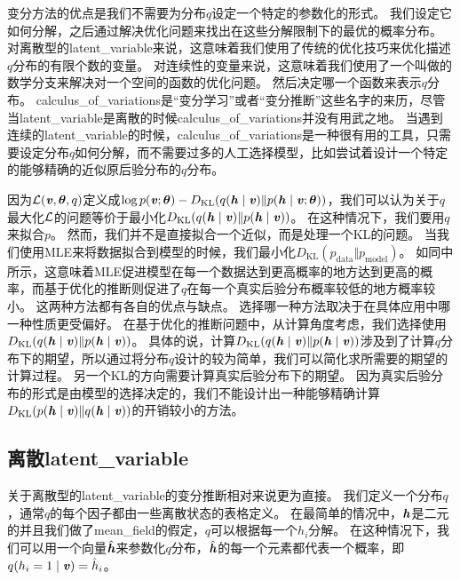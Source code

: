 变分方法的优点是我们不需要为分布$q$设定一个特定的参数化的形式。
我们设定它如何分解，之后通过解决优化问题来找出在这些分解限制下的最优的概率分布。
对离散型的\gls{latent_variable}来说，这意味着我们使用了传统的优化技巧来优化描述$q$分布的有限个数的变量。
对连续性的变量来说，这意味着我们使用了一个叫做的数学分支来解决对一个空间的函数的优化问题。
然后决定哪一个函数来表示$q$分布。
\gls{calculus_of_variations}是``变分学习''或者``变分推断''这些名字的来历，尽管当\gls{latent_variable}是离散的时候\gls{calculus_of_variations}并没有用武之地。
当遇到连续的\gls{latent_variable}的时候，\gls{calculus_of_variations}是一种很有用的工具，只需要设定分布$q$如何分解，而不需要过多的人工选择模型，比如尝试着设计一个特定的能够精确的近似原后验分布的$q$分布。


因为$\mathcal{L}(\boldsymbol{\mathit{v}},\boldsymbol{\theta},q)$定义成$\log p(\boldsymbol{\mathit{v}};\boldsymbol{\theta}) - D_{\text{KL}} (q(\boldsymbol{\mathit{h}}\mid\boldsymbol{\mathit{v}}) \Vert  p(\boldsymbol{\mathit{h}}\mid\boldsymbol{\mathit{v}};\boldsymbol{\theta}) )$，我们可以认为关于$q$最大化$\mathcal{L}$的问题等价于最小化$D_{\text{KL}}(q(\boldsymbol{\mathit{h}}\mid\boldsymbol{\mathit{v}})\Vert p(\boldsymbol{\mathit{h}}\mid\boldsymbol{\mathit{v}}))$。
在这种情况下，我们要用$q$来拟合$p$。
然而，我们并不是直接拟合一个近似，而是处理一个\gls{KL}的问题。
当我们使用\gls{MLE}来将数据拟合到模型的时候，我们最小化$D_{\text{KL}}(p_{\text{data}} \Vert p_{\text{model}})$。
如同中所示，这意味着\gls{MLE}促进模型在每一个数据达到更高概率的地方达到更高的概率，而基于优化的推断则促进了$q$在每一个真实后验分布概率较低的地方概率较小。
这两种方法都有各自的优点与缺点。
选择哪一种方法取决于在具体应用中哪一种性质更受偏好。
在基于优化的推断问题中，从计算角度考虑，我们选择使用$D_{\text{KL}}(q(\boldsymbol{\mathit{h}}\mid\boldsymbol{\mathit{v}})\Vert p(\boldsymbol{\mathit{h}}\mid\boldsymbol{\mathit{v}}))$。
具体的说，计算$D_{\text{KL}}(q(\boldsymbol{\mathit{h}}\mid\boldsymbol{\mathit{v}})\Vert p(\boldsymbol{\mathit{h}}\mid\boldsymbol{\mathit{v}}))$涉及到了计算$q$分布下的期望，所以通过将分布$q$设计的较为简单，我们可以简化求所需要的期望的计算过程。
另一个\gls{KL}的方向需要计算真实后验分布下的期望。
因为真实后验分布的形式是由模型的选择决定的，我们不能设计出一种能够精确计算$D_{\text{KL}}(p(\boldsymbol{\mathit{h}}\mid\boldsymbol{\mathit{v}}) \Vert q(\boldsymbol{\mathit{h}}\mid\boldsymbol{\mathit{v}}))$的开销较小的方法。




\subsection{离散\gls{latent_variable}}
\label{sec:discrete_latent_variables}

关于离散型的\gls{latent_variable}的变分推断相对来说更为直接。
我们定义一个分布$q$，通常$q$的每个因子都由一些离散状态的表格定义。
在最简单的情况中，$\boldsymbol{\mathit{h}}$是二元的并且我们做了\gls{mean_field}的假定，$q$可以根据每一个$h_i$分解。
在这种情况下，我们可以用一个向量$\hat{\boldsymbol{\mathit{h}}}$来参数化$q$分布，$\hat{\boldsymbol{\mathit{h}}}$的每一个元素都代表一个概率，即$q(h_i = 1\mid \boldsymbol{\mathit{v}}) = \hat{h}_i$。


